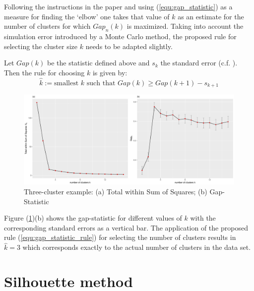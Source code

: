 Following the instructions in the paper and using (\ref{equ:gap_statistic}) as a measure for finding the `elbow' one takes that value of $k$ as an estimate for the number of clusters for which $Gap_n(k)$ is maximized. Taking into account the simulation error introduced by a Monte Carlo method, the proposed rule for selecting the cluster size $k$ needs to be adapted slightly. 

\begin{definition} Let $Gap(k)$ be the statistic defined above and $s_k$ the standard error (c.f. \cite{tibshirani2001estimating}). Then the rule for choosing $k$ is given by: 
	\begin{equation}\label{equ:gap_statistic_rule}
	\hat{k} := \text{smallest } k \text{ such that } Gap(k) \geq Gap(k+1) - s_{k+1}
	\end{equation}
\end{definition}

\begin{figure}
	\centering
	\includegraphics[width=\textwidth]{figures/chapter_k_means/gap_withinSS}
	\caption{Three-cluster example: (a) Total within Sum of Squares; (b) Gap-Statistic}
	\label{fig:gap_statistics}
\end{figure}

Figure (\ref{fig:gap_statistics})(b) shows the gap-statistic for different values of $k$ with the corresponding standard errors as a vertical bar. The application of the proposed rule (\ref{equ:gap_statistic_rule}) for selecting the number of clusters results in $\hat{k} = 3$ which corresponds exactly to the actual number of clusters in the data set. 

\section{Silhouette method}\label{sec:silhouette}


